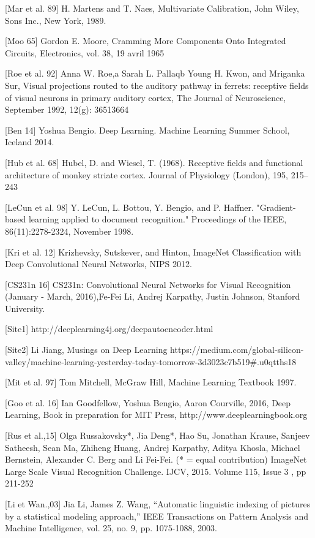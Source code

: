 [Mar et al. 89] H. Martens and T. Naes, Multivariate Calibration, John Wiley, Sons Inc., New York, 1989.

[Moo 65] Gordon E. Moore, Cramming More Components Onto Integrated Circuits, Electronics, vol. 38,‎ 19 avril 1965

[Roe et al. 92] Anna W. Roe,a Sarah L. Pallaqb Young H. Kwon, and Mriganka Sur, Visual projections routed to the auditory pathway in ferrets: receptive fields of visual neurons in primary auditory cortex, The Journal of Neuroscience, September 1992, 12(g): 36513664

[Ben 14] Yoshua Bengio. Deep Learning. Machine Learning Summer School, Iceland 2014.

[Hub et al. 68] Hubel, D. and Wiesel, T. (1968). Receptive fields and functional architecture of monkey striate cortex. Journal of Physiology (London), 195, 215–243

[LeCun et al. 98] Y. LeCun, L. Bottou, Y. Bengio, and P. Haffner. "Gradient-based learning applied to document recognition." Proceedings of the IEEE, 86(11):2278-2324, November 1998. 

[Kri et al. 12] Krizhevsky, Sutskever, and Hinton, ImageNet Classification with Deep Convolutional Neural Networks, NIPS 2012.

[CS231n 16] CS231n: Convolutional Neural Networks for Visual Recognition (January - March, 2016),Fe-Fei Li, Andrej Karpathy, Justin Johnson, Stanford University.

[Site1] http://deeplearning4j.org/deepautoencoder.html

[Site2] Li Jiang, Musings on Deep Learning https://medium.com/global-silicon-valley/machine-learning-yesterday-today-tomorrow-3d3023c7b519\#.u0qtths18

[Mit et al. 97] Tom Mitchell, McGraw Hill, Machine Learning Textbook 1997.

[Goo et al. 16] Ian Goodfellow, Yoshua Bengio, Aaron Courville, 2016, Deep Learning, Book in preparation for MIT Press, http://www.deeplearningbook.org

[Rus et al.,15] Olga Russakovsky*, Jia Deng*, Hao Su, Jonathan Krause, Sanjeev Satheesh, Sean Ma, Zhiheng Huang, Andrej Karpathy, Aditya Khosla, Michael Bernstein, Alexander C. Berg and Li Fei-Fei. (* = equal contribution) ImageNet Large Scale Visual Recognition Challenge. IJCV, 2015. Volume 115, Issue 3 , pp 211-252 

[Li et Wan.,03] Jia Li, James Z. Wang, ``Automatic linguistic indexing of pictures by a statistical modeling approach,'' IEEE Transactions on Pattern Analysis and Machine Intelligence, vol. 25, no. 9, pp. 1075-1088, 2003.


